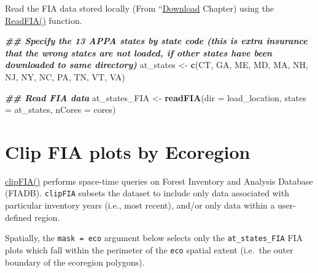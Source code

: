 \documentclass[
]{book}
\newenvironment{Shaded}{\begin{snugshade}}{\end{snugshade}}
\newcommand{\AttributeTok}[1]{\textcolor[rgb]{0.13,0.29,0.53}{#1}}
\newcommand{\DocumentationTok}[1]{\textcolor[rgb]{0.56,0.35,0.01}{\textbf{\textit{#1}}}}
\newcommand{\FunctionTok}[1]{\textcolor[rgb]{0.13,0.29,0.53}{\textbf{#1}}}
\newcommand{\NormalTok}[1]{#1}
\newcommand{\OtherTok}[1]{\textcolor[rgb]{0.56,0.35,0.01}{#1}}
\newcommand{\StringTok}[1]{\textcolor[rgb]{0.31,0.60,0.02}{#1}}
\begin{document}
Read the FIA data stored locally (From ``\protect\hyperlink{download}{Download} Chapter) using the \href{https://rdrr.io/cran/rFIA/man/readFIA.html}{ReadFIA()} function.

\begin{Shaded}
\begin{Highlighting}[]
\DocumentationTok{\#\# Specify the 13 APPA states by state code (this is extra insurance that the wrong states are not loaded, if other states have been downloaded to same directory)}
\NormalTok{at\_states }\OtherTok{\textless{}{-}} \FunctionTok{c}\NormalTok{(}\StringTok{\textquotesingle{}CT\textquotesingle{}}\NormalTok{, }\StringTok{\textquotesingle{}GA\textquotesingle{}}\NormalTok{, }\StringTok{\textquotesingle{}ME\textquotesingle{}}\NormalTok{, }\StringTok{\textquotesingle{}MD\textquotesingle{}}\NormalTok{, }\StringTok{\textquotesingle{}MA\textquotesingle{}}\NormalTok{, }
               \StringTok{\textquotesingle{}NH\textquotesingle{}}\NormalTok{, }\StringTok{\textquotesingle{}NJ\textquotesingle{}}\NormalTok{, }\StringTok{\textquotesingle{}NY\textquotesingle{}}\NormalTok{, }\StringTok{\textquotesingle{}NC\textquotesingle{}}\NormalTok{, }\StringTok{\textquotesingle{}PA\textquotesingle{}}\NormalTok{, }
               \StringTok{\textquotesingle{}TN\textquotesingle{}}\NormalTok{, }\StringTok{\textquotesingle{}VT\textquotesingle{}}\NormalTok{, }\StringTok{\textquotesingle{}VA\textquotesingle{}}\NormalTok{)}

\DocumentationTok{\#\# Read FIA data }
\NormalTok{at\_states\_FIA }\OtherTok{\textless{}{-}} \FunctionTok{readFIA}\NormalTok{(}\AttributeTok{dir =}\NormalTok{ load\_location, }\AttributeTok{states =}\NormalTok{ at\_states, }\AttributeTok{nCores =}\NormalTok{ cores)}
\end{Highlighting}
\end{Shaded}

\hypertarget{clip-fia-plots-by-ecoregion}{%
\section{Clip FIA plots by Ecoregion}\label{clip-fia-plots-by-ecoregion}}

\href{https://rdrr.io/cran/rFIA/man/clipFIA.html}{clipFIA()} performs space-time queries on Forest Inventory and Analysis Database (FIADB). \texttt{clipFIA} subsets the dataset to include only data associated with particular inventory years (i.e., most recent), and/or only data within a user-defined region.

Spatially, the \texttt{mask\ =\ eco} argument below selects only the \texttt{at\_states\_FIA} FIA plots which fall within the perimeter of the \texttt{eco} spatial extent (i.e.~the outer boundary of the ecoregion polygons).
\end{document}
